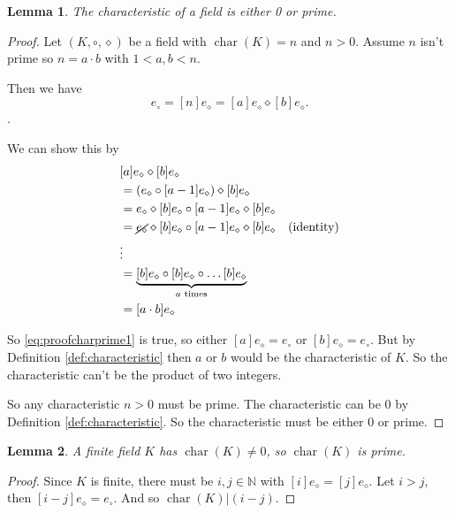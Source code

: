 \documentclass{article}
\newtheorem{lemma}{Lemma}
\newcommand{\NN}{\mathbb{N}}
\newcommand{\mchar}{\operatorname{char}}
\begin{document}
\begin{lemma}
    The characteristic of a field is either 0 or prime.
\end{lemma}

\begin{proof}
    Let $(K, \circ, \diamond)$ be a field with $\mchar(K) = n$ and
    $n > 0$. Assume $n$ isn't prime so $n = a \cdot b$ with $1 < a, b <n$.

    Then we have
    \begin{equation}\label{eq:proofcharprime1}
        e_\circ = [n]e_\diamond = [a]e_\diamond \diamond [b]e_\diamond.
    \end{equation}.

    We can show this by
    \begin{align*}
          & [a] e_\diamond \diamond [b]e_\diamond                                             \\
          & = (e_\diamond \circ [a-1] e_\diamond) \diamond [b] e_\diamond                     \\
          & = e_\diamond \diamond [b]e_\diamond \circ [a-1] e_\diamond \diamond [b]e_\diamond \\
          & = \cancel{e_\diamond} \diamond [b]e_\diamond \circ [a-1] e_\diamond \diamond [b]e_\diamond & \mbox{(identity)} \\
          &\vdots \\
          & = \underbrace{[b] e_\diamond \circ [b] e_\diamond \circ \dots [b] e_\diamond}_\text{$a$ times} \\
          & = [a \cdot b] e_\diamond
    \end{align*}

    So \eqref{eq:proofcharprime1} is true, so either $[a]e_\diamond = e_\circ$ or $[b]e_\diamond = e_\circ$.
    But by Definition \ref{def:characteristic} then $a$ or $b$ would be the characteristic of $K$. So the
    characteristic can't be the product of two integers.

    So any characteristic $n > 0$ must be prime. The characteristic can be 0 by
    Definition \ref{def:characteristic}. So the characteristic must be either
    0 or prime.
\end{proof}

\begin{lemma}
    A finite field $K$ has $\mchar(K) \ne 0$, so $\mchar(K)$ is prime.
\end{lemma}
\begin{proof}
    Since $K$ is finite, there must be $i, j \in \NN$ with $[i]e_\diamond = [j]e_\diamond$.
    Let $i > j$, then $[i-j] e_\diamond = e_\circ$. And so $\mchar(K)|(i-j)$.
\end{proof}
\end{document}
